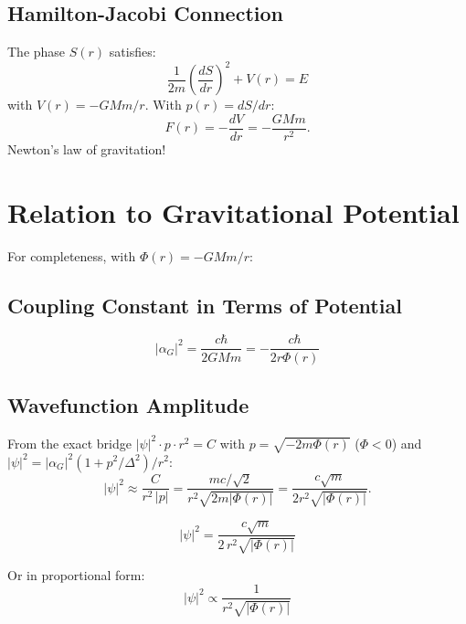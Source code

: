 \documentclass[11pt,a4paper]{article}
\theoremstyle{definition}
\theoremstyle{remark}
\begin{document}
	\subsection{Hamilton-Jacobi Connection}
	
	The phase $S(r)$ satisfies:
	\begin{equation}
		\frac{1}{2m}\!\left(\frac{dS}{dr}\right)^2 + V(r) = E
	\end{equation}
	with $V(r)=-GMm/r$.  With $p(r)=dS/dr$:
	\begin{equation}
		F(r) = -\frac{dV}{dr} = -\frac{GMm}{r^2}.
	\end{equation}
	Newton's law of gravitation!
	
	\section{Relation to Gravitational Potential}
	
	For completeness, with $\Phi(r)=-GMm/r$:
	
	\subsection{Coupling Constant in Terms of Potential}
	
	\begin{equation}
		|\alpha_G|^2 = \frac{c\hbar}{2GMm} = -\frac{c\hbar}{2r\Phi(r)}
	\end{equation}
	
	\subsection{Wavefunction Amplitude}
	
	From the exact bridge $|\psi|^2 \cdot p \cdot r^2 = C$ with $p=\sqrt{-2m\Phi(r)}$ ($\Phi<0$) and $|\psi|^2 = |\alpha_G|^2(1+p^2/\Delta^2)/r^2$:
	\begin{equation}
		|\psi|^2 \approx \frac{C}{r^2\,|p|} = \frac{mc/\sqrt{2}}{r^2\sqrt{2m|\Phi(r)|}} = \frac{c\sqrt{m}}{2r^2\sqrt{|\Phi(r)|}}.
	\end{equation}
	
	\begin{equation}
		\boxed{|\psi|^2 = \frac{c\sqrt{m}}{2\,r^2\sqrt{|\Phi(r)|}}}
	\end{equation}
	
	Or in proportional form:
	\begin{equation}
		\boxed{|\psi|^2 \propto \frac{1}{r^2\sqrt{|\Phi(r)|}}}
	\end{equation}
	
\end{document}
